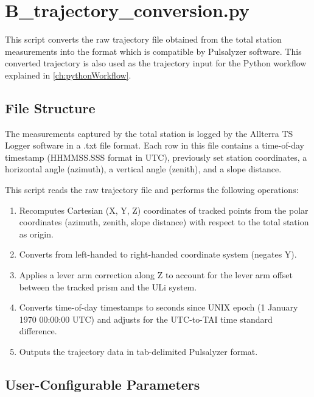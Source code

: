 \chapter{B\_trajectory\_conversion.py}
\label{ch:scriptB}

This script converts the raw trajectory file obtained from the total station measurements into the format which is compatible by Pulsalyzer software. This converted trajectory is also used as the trajectory input for the Python workflow explained in \autoref{ch:pythonWorkflow}.

\section{File Structure}
The measurements captured by the total station is logged by the Allterra TS Logger software in a .txt file format. Each row in this file contains a time-of-day timestamp (HHMMSS.SSS format in UTC), previously set station coordinates, a horizontal angle (azimuth), a vertical angle (zenith), and a slope distance.

This script reads the raw trajectory file and performs the following operations:

\begin{enumerate}
    \item Recomputes Cartesian (X, Y, Z) coordinates of tracked points from the polar coordinates (azimuth, zenith, slope distance) with respect to the total station as origin.
    \item Converts from left-handed to right-handed coordinate system (negates Y).
    \item Applies a lever arm correction along Z to account for the lever arm offset between the tracked prism and the ULi system.
    \item Converts time-of-day timestamps to seconds since UNIX epoch (1 January 1970 00:00:00 UTC) and adjusts for the UTC-to-TAI time standard difference.
    \item Outputs the trajectory data in tab-delimited Pulsalyzer format.
\end{enumerate}

\section{User-Configurable Parameters}

